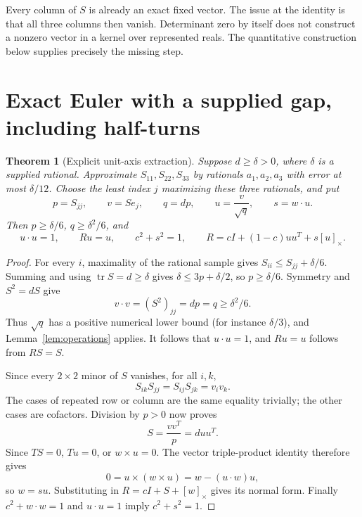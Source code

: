 \documentclass[11pt]{article}
\newtheorem{theorem}{Theorem}[section]
\theoremstyle{definition}\newtheorem{definition}[theorem]{Definition}
\newcommand{\tr}{\operatorname{tr}}\newcommand{\adj}{\operatorname{adj}}
\newcommand{\crossmat}[1]{[#1]_{\times}}
\begin{document}
Every column of $S$ is already an exact fixed vector. The issue at the
identity is that all three columns then vanish. Determinant zero by itself
does not construct a nonzero vector in a kernel over represented reals.
The quantitative construction below supplies precisely the missing step.

\section{Exact Euler with a supplied gap, including half-turns}
\label{sec:gap}

\begin{theorem}[Explicit unit-axis extraction]\label{thm:gap}
Suppose $d\ge\delta>0$, where $\delta$ is a supplied rational.
Approximate $S_{11},S_{22},S_{33}$ by rationals $a_1,a_2,a_3$ with error
at most $\delta/12$. Choose the least index $j$ maximizing these three
rationals, and put
\begin{equation}\label{eq:axis-construction}
 p=S_{jj},\qquad v=Se_j,\qquad q=d p,\qquad
 u=\frac{v}{\sqrt q},\qquad s=w\cdot u.
\end{equation}
Then $p\ge\delta/6$, $q\ge\delta^2/6$, and
\begin{equation}\label{eq:exactnormal}
 u\cdot u=1,\qquad Ru=u,\qquad
 c^2+s^2=1,\qquad R=cI+(1-c)uu^T+s\crossmat u.
\end{equation}
\end{theorem}
\begin{proof}
For every $i$, maximality of the rational sample gives
$S_{ii}\le S_{jj}+\delta/6$. Summing and using $\tr S=d\ge\delta$
gives $\delta\le3p+\delta/2$, so $p\ge\delta/6$.
Symmetry and $S^2=dS$ give
\[
 v\cdot v=(S^2)_{jj}=dp=q\ge\delta^2/6.
\]
Thus $\sqrt q$ has a positive numerical lower bound (for instance
$\delta/3$), and Lemma~\ref{lem:operations} applies. It follows that
$u\cdot u=1$, and $Ru=u$ follows from $RS=S$.

Since every $2\times2$ minor of $S$ vanishes, for all $i,k$,
\[
 S_{ik}S_{jj}=S_{ij}S_{jk}=v_i v_k.
\]
The cases of repeated row or column are the same equality trivially;
the other cases are cofactors. Division by $p>0$ now proves
\begin{equation}\label{eq:projector}
 S=\frac{vv^T}{p}=d uu^T.
\end{equation}
Since $TS=0$, $Tu=0$, or $w\times u=0$. The vector triple-product identity
therefore gives
\[
 0=u\times(w\times u)=w-(u\cdot w)u,
\]
so $w=su$. Substituting in $R=cI+S+\crossmat w$ gives its normal form.
Finally $c^2+w\cdot w=1$ and $u\cdot u=1$ imply $c^2+s^2=1$.
\end{proof}
\end{document}
